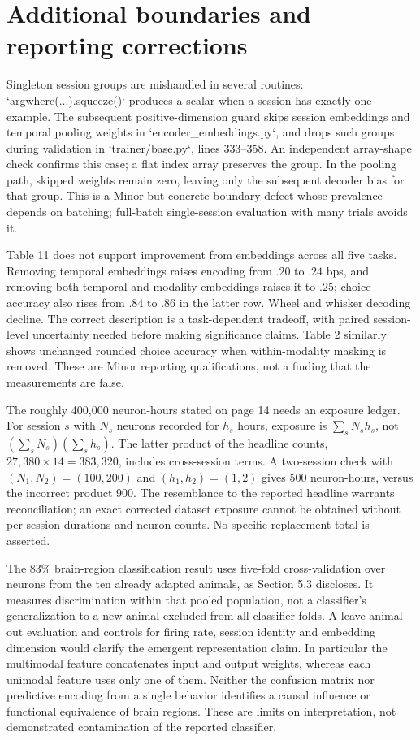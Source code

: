\documentclass[10pt]{article}
\begin{document}
\section*{Additional boundaries and reporting corrections}
Singleton session groups are mishandled in several routines: `argwhere(...).squeeze()` produces a scalar when a session has exactly one example. The subsequent positive-dimension guard skips session embeddings and temporal pooling weights in `encoder\_embeddings.py`, and drops such groups during validation in `trainer/base.py`, lines 333–358. An independent array-shape check confirms this case; a flat index array preserves the group. In the pooling path, skipped weights remain zero, leaving only the subsequent decoder bias for that group. This is a Minor but concrete boundary defect whose prevalence depends on batching; full-batch single-session evaluation with many trials avoids it.\par
Table 11 does not support improvement from embeddings across all five tasks. Removing temporal embeddings raises encoding from \(.20\) to \(.24\) bps, and removing both temporal and modality embeddings raises it to \(.25\); choice accuracy also rises from \(.84\) to \(.86\) in the latter row. Wheel and whisker decoding decline. The correct description is a task-dependent tradeoff, with paired session-level uncertainty needed before making significance claims. Table 2 similarly shows unchanged rounded choice accuracy when within-modality masking is removed. These are Minor reporting qualifications, not a finding that the measurements are false.\par
The roughly 400,000 neuron-hours stated on page 14 needs an exposure ledger. For session \(s\) with \(N_s\) neurons recorded for \(h_s\) hours, exposure is \(\sum_s N_s h_s\), not \((\sum_s N_s)(\sum_s h_s)\). The latter product of the headline counts, \(27{,}380\times14=383{,}320\), includes cross-session terms. A two-session check with \((N_1,N_2)=(100,200)\) and \((h_1,h_2)=(1,2)\) gives 500 neuron-hours, versus the incorrect product 900. The resemblance to the reported headline warrants reconciliation; an exact corrected dataset exposure cannot be obtained without per-session durations and neuron counts. No specific replacement total is asserted.\par
The 83\% brain-region classification result uses five-fold cross-validation over neurons from the ten already adapted animals, as Section 5.3 discloses. It measures discrimination within that pooled population, not a classifier’s generalization to a new animal excluded from all classifier folds. A leave-animal-out evaluation and controls for firing rate, session identity and embedding dimension would clarify the emergent representation claim. In particular the multimodal feature concatenates input and output weights, whereas each unimodal feature uses only one of them. Neither the confusion matrix nor predictive encoding from a single behavior identifies a causal influence or functional equivalence of brain regions. These are limits on interpretation, not demonstrated contamination of the reported classifier.\par
\end{document}
